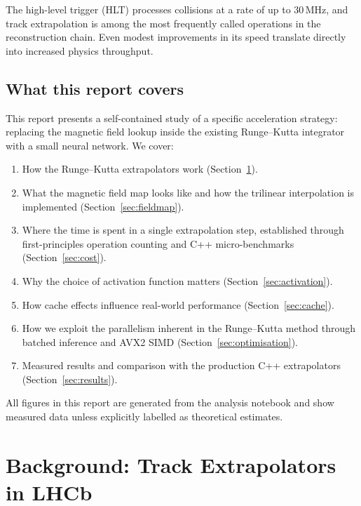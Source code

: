 \documentclass[11pt,a4paper]{article}
\begin{document}
The high-level trigger (HLT) processes collisions at a rate of up to
30\,MHz, and track extrapolation is among the most frequently called
operations in the reconstruction chain.  Even modest improvements in
its speed translate directly into increased physics throughput.


\subsection{What this report covers}

This report presents a self-contained study of a specific acceleration
strategy: replacing the magnetic field lookup inside the existing
Runge--Kutta integrator with a small neural network.  We cover:

\begin{enumerate}
    \item How the Runge--Kutta extrapolators work
          (Section~\ref{sec:extrapolators}).
    \item What the magnetic field map looks like and how the trilinear
          interpolation is implemented
          (Section~\ref{sec:fieldmap}).
    \item Where the time is spent in a single extrapolation step,
          established through first-principles operation counting and
          C++ micro-benchmarks (Section~\ref{sec:cost}).
    \item Why the choice of activation function matters
          (Section~\ref{sec:activation}).
    \item How cache effects influence real-world performance
          (Section~\ref{sec:cache}).
    \item How we exploit the parallelism inherent in the Runge--Kutta
          method through batched inference and AVX2 SIMD
          (Section~\ref{sec:optimisation}).
    \item Measured results and comparison with the production
          C++ extrapolators (Section~\ref{sec:results}).
\end{enumerate}

All figures in this report are generated from the analysis notebook
and show measured data unless explicitly labelled as theoretical
estimates.


\section{Background: Track Extrapolators in LHCb}
\label{sec:extrapolators}
\end{document}
